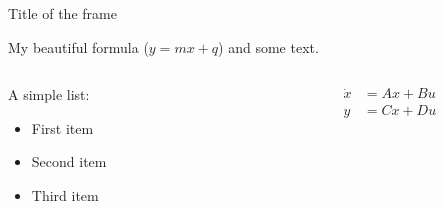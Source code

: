 \begin{frame}{Title of the frame}


    My beautiful formula ($y = mx + q$) and some text.

    \begin{columns}[c, onlytextwidth]

        \begin{column}{0.3\textwidth}

            A simple list:

            \begin{itemize}
                \item First item
                \item Second item
                \item Third item
            \end{itemize}

        \end{column}

        \begin{column}{0.7\textwidth}

            \begin{equation}
                \begin{aligned}
                    \dot{x} & = Ax + Bu \\
                    y       & = Cx + Du
                \end{aligned}
            \end{equation}

        \end{column}

    \end{columns}

\end{frame}